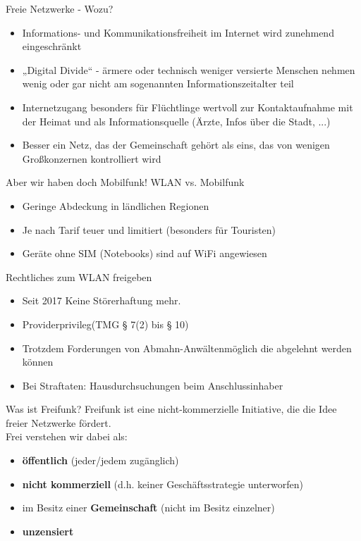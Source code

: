 \documentclass{beamer}
\begin{document}
\begin{frame}{Freie Netzwerke - Wozu?}
\begin{itemize}
\item Informations- und Kommunikationsfreiheit im Internet wird zunehmend eingeschränkt
\item „Digital Divide“ - ärmere oder technisch weniger versierte Menschen nehmen wenig oder gar nicht am sogenannten Informationszeitalter teil
\item Internetzugang besonders für Flüchtlinge wertvoll zur Kontaktaufnahme mit der Heimat und als Informationsquelle (Ärzte, Infos über die Stadt, ...)
\item Besser ein Netz, das der Gemeinschaft gehört als eins, das von wenigen Großkonzernen kontrolliert wird
\end{itemize}
\end{frame}

\begin{frame}{\glqq Aber wir haben doch Mobilfunk!\grqq}
WLAN vs. Mobilfunk
\begin{itemize}
\item Geringe Abdeckung in ländlichen Regionen
\item Je nach Tarif teuer und limitiert (besonders für Touristen)
\item Geräte ohne SIM (Notebooks) sind auf WiFi angewiesen
\end{itemize}

\end{frame}



\begin{frame}{Rechtliches zum WLAN freigeben}
\begin{itemize}
\item Seit 2017 Keine Störerhaftung mehr.
\item \glqq Providerprivileg\grqq (TMG § 7(2)  bis § 10)
\item Trotzdem Forderungen von \glqq Abmahn-Anwälten\grqq möglich die abgelehnt werden können
\item Bei Straftaten: Hausdurchsuchungen beim Anschlussinhaber
\end{itemize}
\end{frame}

\begin{frame}{Was ist Freifunk?}
Freifunk ist eine nicht-kommerzielle Initiative, die die Idee freier Netzwerke fördert. \\ 
Frei verstehen wir dabei als:
\begin{itemize}
\item \textbf{öffentlich} (jeder/jedem zugänglich)
\item \textbf{nicht kommerziell} (d.h. keiner Geschäftsstrategie unterworfen)
\item im Besitz einer \textbf{Gemeinschaft} (nicht im Besitz einzelner)
\item \textbf{unzensiert}
\end{itemize}
\end{frame}
\end{document}

